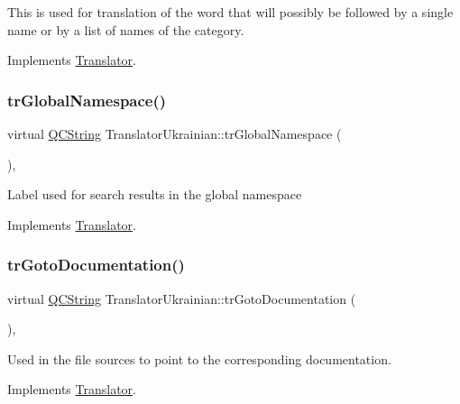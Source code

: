 This is used for translation of the word that will possibly be followed by a single name or by a list of names of the category. 

Implements \mbox{\hyperlink{class_translator}{Translator}}.

\mbox{\label{class_translator_ukrainian_a8566dbe7994416751438d978e76b6433}} 
\subsubsection{\texorpdfstring{trGlobalNamespace()}{trGlobalNamespace()}}
{\footnotesize\ttfamily virtual \mbox{\hyperlink{class_q_c_string}{Q\+C\+String}} Translator\+Ukrainian\+::tr\+Global\+Namespace (\begin{DoxyParamCaption}{ }\end{DoxyParamCaption})\hspace{0.3cm}{\ttfamily [inline]}, {\ttfamily [virtual]}}

Label used for search results in the global namespace 

Implements \mbox{\hyperlink{class_translator}{Translator}}.

\mbox{\label{class_translator_ukrainian_ad9d1c1ce733190f600196ad78eadd476}} 
\subsubsection{\texorpdfstring{trGotoDocumentation()}{trGotoDocumentation()}}
{\footnotesize\ttfamily virtual \mbox{\hyperlink{class_q_c_string}{Q\+C\+String}} Translator\+Ukrainian\+::tr\+Goto\+Documentation (\begin{DoxyParamCaption}{ }\end{DoxyParamCaption})\hspace{0.3cm}{\ttfamily [inline]}, {\ttfamily [virtual]}}

Used in the file sources to point to the corresponding documentation. 

Implements \mbox{\hyperlink{class_translator}{Translator}}.

